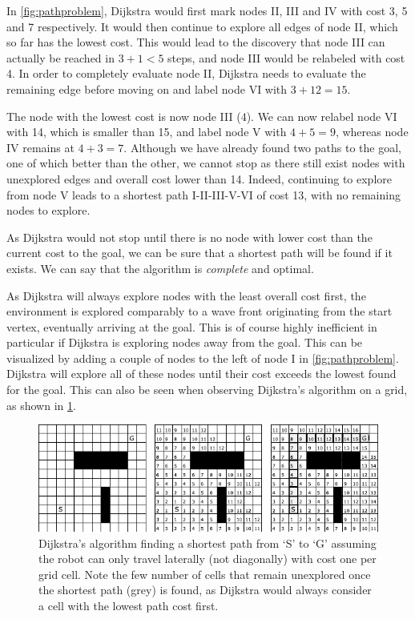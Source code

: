 In \cref{fig:pathproblem}, Dijkstra would first mark nodes II, III and IV with cost 3, 5 and 7 respectively. It would then continue to explore all edges of node II, which so far has the lowest cost. This would lead to the discovery that node III can actually be reached in $3+1<5$ steps, and node III would be relabeled with cost 4. In order to completely evaluate node II, Dijkstra needs to evaluate the remaining edge before moving on and label node VI with $3+12=15$.

The node with the lowest cost is now node III (4). We can now relabel node VI with 14, which is smaller than 15, and label node V with $4+5=9$, whereas node IV remains at $4+3=7$. Although we have already found two paths to the goal, one of which better than the other, we cannot stop as there still exist nodes with unexplored edges and overall cost lower than 14. Indeed, continuing to explore from node V leads to a shortest path I-II-III-V-VI of cost 13, with no remaining nodes to explore.

As Dijkstra would not stop until there is no node with lower cost than the current cost to the goal, we can be sure that a shortest path will be found if it exists. We can say that the algorithm is \textsl{complete} and optimal.

As Dijkstra will always explore nodes with the least overall cost first, the environment is explored comparably to a wave front originating from the start vertex, eventually arriving at the goal. This is of course highly inefficient in particular if Dijkstra is exploring nodes away from the goal. This can be visualized by adding a couple of nodes to the left of node I in \cref{fig:pathproblem}. Dijkstra will explore all of these nodes until their cost exceeds the lowest found for the goal. This can also be seen when observing Dijkstra's algorithm on a grid, as shown in \cref{fig:dijkstragrid}.

\begin{figure}[htb]
    \centering
    \includegraphics[width=\textwidth]{figs/dijkstragrid.pdf}
    \caption{Dijkstra's algorithm finding a shortest path from `S' to `G' assuming the robot can only travel laterally (not diagonally) with cost one per grid cell. Note the few number of cells that remain unexplored once the shortest path (grey) is found, as Dijkstra would always consider a cell with the lowest path cost first.\label{fig:dijkstragrid}}
\end{figure}

